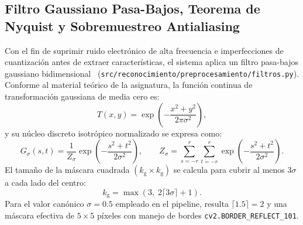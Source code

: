 \documentclass{article}
\begin{document}
\subsection{Filtro Gaussiano Pasa-Bajos, Teorema de Nyquist y Sobremuestreo Antialiasing}
Con el fin de suprimir ruido electrónico de alta frecuencia e imperfecciones de cuantización antes de extraer características, el sistema aplica un filtro pasa-bajos gaussiano bidimensional~\cite{gonzalez2018digital} (\texttt{src/reconocimiento/preprocesamiento/filtros.py}). Conforme al material teórico de la asignatura, la función continua de transformación gaussiana de media cero es:
\begin{equation}
T(x, y) = \exp\!\left(-\frac{x^2 + y^2}{2\pi\sigma^2}\right),
\label{eq:gauss_teorica}
\end{equation}
y su núcleo discreto isotrópico normalizado se expresa como:
\begin{equation}
G_\sigma(s, t) = \frac{1}{Z_\sigma} \exp\!\left(-\frac{s^2 + t^2}{2\sigma^2}\right), \qquad Z_\sigma = \sum_{s=-r}^{r}\sum_{t=-r}^{r} \exp\!\left(-\frac{s^2 + t^2}{2\sigma^2}\right).
\label{eq:gauss_discreta}
\end{equation}
El tamaño de la máscara cuadrada $(k_{\text{g}} \times k_{\text{g}})$ se calcula para cubrir al menos $3\sigma$ a cada lado del centro:
\begin{equation}
k_{\text{g}} = \max\!\left(3,\; 2\lceil 3\sigma \rceil + 1\right).
\label{eq:tamano_kernel_gauss}
\end{equation}
Para el valor canónico $\sigma = 0.5$ empleado en el pipeline, resulta $\lceil 1.5 \rceil = 2$ y una máscara efectiva de $5 \times 5$ píxeles con manejo de bordes \texttt{cv2.BORDER\_REFLECT\_101}.
\end{document}
